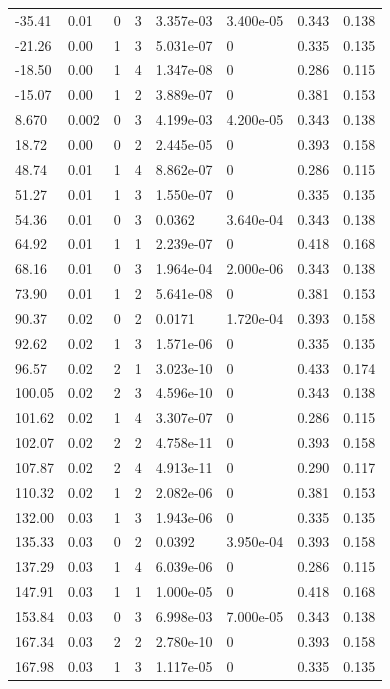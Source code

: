 \documentclass[preview]{standalone}
\begin{document}
{{\begin{tabular}{L{1.2cm}C{1.2cm} C{0.3cm}C{0.5cm} C{1.4cm}C{1.4cm} C{1.4cm}C{1.4cm}}
  -35.41  &  0.01  & 0     &  3 &  3.357e-03  & 3.400e-05  & 0.343 &  0.138   \\ 
  -21.26  &  0.00  & 1     &  3 &  5.031e-07  & 0  & 0.335 &  0.135   \\ 
  -18.50  &  0.00  & 1     &  4 &  1.347e-08  & 0  & 0.286 &  0.115   \\ 
  -15.07  &  0.00  & 1     &  2 &  3.889e-07  & 0  & 0.381 &  0.153   \\ 
  8.670  &  0.002  & 0     &  3 &  4.199e-03  & 4.200e-05  & 0.343 &  0.138   \\ 
  18.72  &  0.00  & 0     &  2 &  2.445e-05  & 0  & 0.393 &  0.158   \\ 
  48.74  &  0.01  & 1     &  4 &  8.862e-07  & 0  & 0.286 &  0.115   \\ 
  51.27  &  0.01  & 1     &  3 &  1.550e-07  & 0  & 0.335 &  0.135   \\ 
  54.36  &  0.01  & 0     &  3 &  0.0362  & 3.640e-04  & 0.343 &  0.138   \\ 
  64.92  &  0.01  & 1     &  1 &  2.239e-07  & 0  & 0.418 &  0.168   \\ 
  68.16  &  0.01  & 0     &  3 &  1.964e-04  & 2.000e-06  & 0.343 &  0.138   \\ 
  73.90  &  0.01  & 1     &  2 &  5.641e-08  & 0  & 0.381 &  0.153   \\ 
  90.37  &  0.02  & 0     &  2 &  0.0171  & 1.720e-04  & 0.393 &  0.158   \\ 
  92.62  &  0.02  & 1     &  3 &  1.571e-06  & 0  & 0.335 &  0.135   \\ 
  96.57  &  0.02  & 2     &  1 &  3.023e-10  & 0  & 0.433 &  0.174   \\ 
  100.05  &  0.02  & 2     &  3 &  4.596e-10  & 0  & 0.343 &  0.138   \\ 
  101.62  &  0.02  & 1     &  4 &  3.307e-07  & 0  & 0.286 &  0.115   \\ 
  102.07  &  0.02  & 2     &  2 &  4.758e-11  & 0  & 0.393 &  0.158   \\ 
  107.87  &  0.02  & 2     &  4 &  4.913e-11  & 0  & 0.290 &  0.117   \\ 
  110.32  &  0.02  & 1     &  2 &  2.082e-06  & 0  & 0.381 &  0.153   \\ 
  132.00  &  0.03  & 1     &  3 &  1.943e-06  & 0  & 0.335 &  0.135   \\ 
  135.33  &  0.03  & 0     &  2 &  0.0392  & 3.950e-04  & 0.393 &  0.158   \\ 
  137.29  &  0.03  & 1     &  4 &  6.039e-06  & 0  & 0.286 &  0.115   \\ 
  147.91  &  0.03  & 1     &  1 &  1.000e-05  & 0  & 0.418 &  0.168   \\ 
  153.84  &  0.03  & 0     &  3 &  6.998e-03  & 7.000e-05  & 0.343 &  0.138   \\ 
  167.34  &  0.03  & 2     &  2 &  2.780e-10  & 0  & 0.393 &  0.158   \\ 
  167.98  &  0.03  & 1     &  3 &  1.117e-05  & 0  & 0.335 &  0.135   \\ 
\hline 
\end{tabular} 

}}
\end{document}
